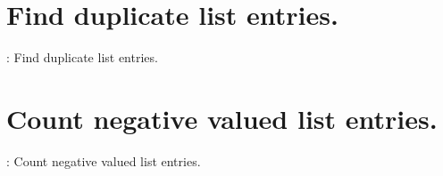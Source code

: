 \documentclass[preview]{standalone}
\begin{document}
\section{Find duplicate list entries.}
\color{lightgray} \begin{algorithm}
    \renewcommand{\thealgorithm}{3105}
    \caption{: Find duplicate list entries.}
    
\end{algorithm} \color{black}
\begin{center}
    
\end{center}
\text{\\}
\begin{center}
    
\end{center}
\pagebreak


\section{Count negative valued list entries.}
\color{lightgray} \begin{algorithm}
    \renewcommand{\thealgorithm}{3106}
    \caption{: Count negative valued list entries.}
    
\end{algorithm} \color{black}
\begin{center}
    
\end{center}
\text{\\}
\begin{center}
    
\end{center}
\pagebreak
\end{document}
